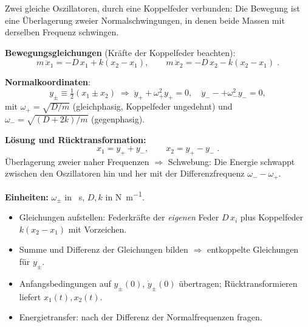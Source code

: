 

Zwei gleiche Oszillatoren, durch eine Koppelfeder verbunden: Die Bewegung ist
eine Überlagerung zweier Normalschwingungen, in denen beide Massen mit
derselben Frequenz schwingen.

\begin{werkzeugkasten}[Werkzeuge]
\textbf{Bewegungsgleichungen} (Kräfte der Koppelfeder beachten):
\begin{equation}
  m\,\ddot x_1=-D\,x_1+k(x_2-x_1),\qquad
  m\,\ddot x_2=-D\,x_2-k(x_2-x_1)\;.
\end{equation}

\textbf{Normalkoordinaten}:
\begin{equation}
  y_\pm\equiv\tfrac12(x_1\pm x_2)
  \;\Rightarrow\;
  \ddot y_++\omega_+^2 y_+=0,\quad
  \ddot y_--+\omega_-^2 y_-=0,
\end{equation}
mit $\omega_+=\sqrt{D/m}$ (gleichphasig, Koppelfeder ungedehnt) und
$\omega_-=\sqrt{(D+2k)/m}$ (gegenphasig).

\textbf{Lösung und Rücktransformation:}
\begin{equation}
  x_1=y_++y_-,\qquad x_2=y_+-y_-\;.
\end{equation}
Überlagerung zweier naher Frequenzen $\Rightarrow$ Schwebung: Die Energie
schwappt zwischen den Oszillatoren hin und her mit der Differenzfrequenz
$\omega_--\omega_+$.

\textbf{Einheiten:} $\omega_\pm$ in \unit{\per\second}, $D,k$ in
\unit{\newton\per\metre}.
\end{werkzeugkasten}

\begin{werkzeugkasten}[Vorgehen]
\begin{itemize}
  \item Gleichungen aufstellen: Federkräfte der \emph{eigenen} Feder $D\,x_i$
       plus Koppelfeder $k(x_2-x_1)$ mit Vorzeichen.
  \item Summe und Differenz der Gleichungen bilden $\Rightarrow$
       entkoppelte Gleichungen für $y_\pm$.
  \item Anfangsbedingungen auf $y_\pm(0)$, $\dot y_\pm(0)$ übertragen;
       Rücktransformieren liefert $x_1(t),x_2(t)$.
  \item Energietransfer: nach der Differenz der Normalfrequenzen fragen.
\end{itemize}
\end{werkzeugkasten}

